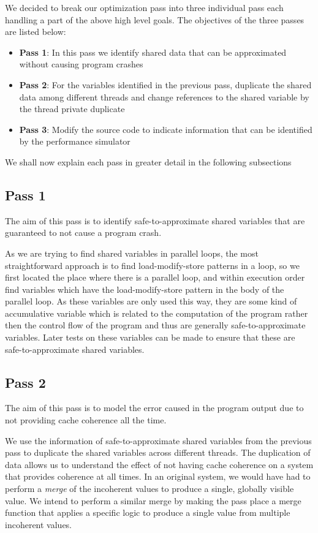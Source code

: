 \documentclass[12pt,conference]{IEEEtran}
\begin{document}
We decided to break our optimization pass into three individual pass each handling
a part of the above high level goals. The objectives of the three passes are listed 
below:
\begin{itemize}
\item \textbf{Pass 1}: In this pass we identify shared data that can be
approximated without causing program crashes
\item \textbf{Pass 2}: For the variables identified in the previous pass,
duplicate the shared data among different threads and change references to the
shared variable by the thread private duplicate
\item \textbf{Pass 3}: Modify the source code to indicate information that
can be identified by the performance simulator
\end{itemize}

We shall now explain each pass in greater detail in the following subsections

\subsection{Pass 1}

The aim of this pass is to identify safe-to-approximate shared variables
that are guaranteed to not cause a program crash.

As we are trying to find shared variables in parallel loops, the most straightforward approach is to find load-modify-store patterns in a loop, so we first located the place where there is a parallel loop, and within execution order find variables which have the load-modify-store pattern in the body of the parallel loop. As these variables are only used this way, they are some kind of accumulative variable which is related to the computation of the program rather then the control flow of the program and thus are generally safe-to-approximate variables. Later tests on these variables can be made to ensure that these are safe-to-approximate shared variables.

\subsection{Pass 2}

The aim of this pass is to model the error caused in the program output
due to not providing cache coherence all the time.

We use the information of safe-to-approximate shared variables 
from the previous pass to 
duplicate the shared variables across different threads. The
duplication of data allows us to understand the effect of not having 
cache coherence on a system that provides coherence at all times. In an 
original system, we would have had to perform a \emph{merge} of the 
incoherent values to produce a single, globally visible value. We 
intend to perform a similar merge by making the pass place a merge 
function that applies a specific logic to produce a single value
from multiple incoherent values.
\end{document}
